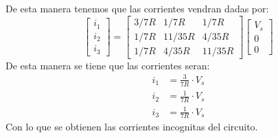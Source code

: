 \documentclass[
  11pt,
  letterpaper,
   addpoints,
  ]{exam}
\begin{document}
\begin{solution}
\begin{enumerate}
\begin{equation}
    \end{equation}
    De esta manera tenemos que las corrientes vendran dadas por:
    \begin{equation}
        \begin{bmatrix}
            i_1 \\
            i_2 \\
            i_3
        \end{bmatrix}
        =
        \begin{bmatrix}
            3/7R & 1/7R & 1/7R \\
            1/7R & 11/35R & 4/35R \\
            1/7R & 4/35R & 11/35R
        \end{bmatrix}
        \begin{bmatrix}
            V_s \\
            0 \\
            0
        \end{bmatrix}
    \end{equation}
    De esta manera se tiene que las corrientes seran:
    \begin{align}
        i_1 &= \frac{3}{7R} \cdot V_s \\
        i_2 &= \frac{1}{7R} \cdot V_s \\
        i_3 &= \frac{1}{7R} \cdot V_s
    \end{align}
    Con lo que se obtienen las corrientes incognitas del circuito.
    \end{enumerate}
\end{solution}
\end{document}
